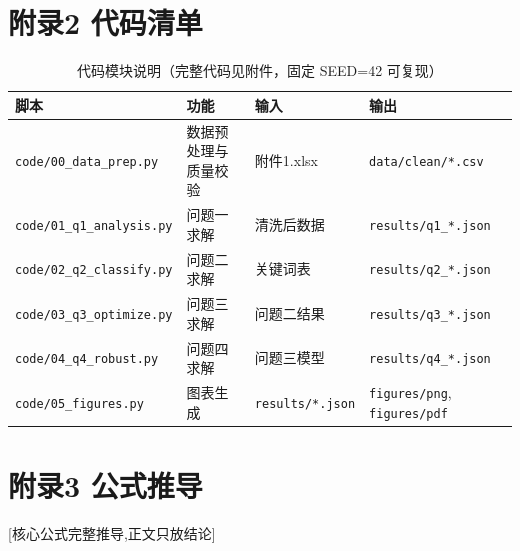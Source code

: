 \documentclass[12pt,a4paper]{ctexart}
\begin{document}
\section{附录2 代码清单}
\begin{table}[H]
\centering
\caption{代码模块说明（完整代码见附件，固定 SEED=42 可复现）}
\label{tab:code_modules}
\begin{tabular}{llll}
\toprule
脚本 & 功能 & 输入 & 输出 \\
\midrule
\texttt{code/00\_data\_prep.py} & 数据预处理与质量校验 & 附件1.xlsx & \texttt{data/clean/*.csv} \\
\texttt{code/01\_q1\_analysis.py} & 问题一求解 & 清洗后数据 & \texttt{results/q1\_*.json} \\
\texttt{code/02\_q2\_classify.py} & 问题二求解 & 关键词表 & \texttt{results/q2\_*.json} \\
\texttt{code/03\_q3\_optimize.py} & 问题三求解 & 问题二结果 & \texttt{results/q3\_*.json} \\
\texttt{code/04\_q4\_robust.py} & 问题四求解 & 问题三模型 & \texttt{results/q4\_*.json} \\
\texttt{code/05\_figures.py} & 图表生成 & \texttt{results/*.json} & \texttt{figures/png}, \texttt{figures/pdf} \\
\bottomrule
\end{tabular}
\end{table}

% 


\section{附录3 公式推导}
[核心公式完整推导,正文只放结论]
\end{document}
